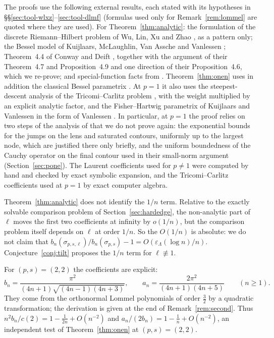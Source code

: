 The proofs use the following external results, each stated with its hypotheses in
\S\S\ref{sec:tool-wlxz}--\ref{sec:tool-dlmf} (formulas used only for Remark~\ref{rem:lommel} are quoted where they are
used). For Theorem~\ref{thm:analytic}: the formulation of the discrete Riemann--Hilbert problem of Wu, Lin, Xu and Zhao
\cite{WLXZ}, as a pattern only; the Bessel model of Kuijlaars, McLaughlin, Van Assche and Vanlessen \cite[\S6]{KMVV};
Theorem~4.4 of Conway and Deift \cite{CD}, together with the argument of their Theorem~4.7 and Proposition~4.9 and one
direction of their Proposition~4.6, which we re-prove; and special-function facts from \cite{DLMF}.
Theorem~\ref{thm:onen} uses in addition the classical Bessel parametrix \cite[(6.42)--(6.53)]{KMVV}. At $p=1$ it also
uses the steepest-descent analysis of the Tricomi--Carlitz problem \cite[\S\S3--6]{WLXZ}, with the weight multiplied by
an explicit analytic factor, and the Fisher--Hartwig parametrix of Kuijlaars and Vanlessen \cite[\S5]{KV} in the form
of Vanlessen \cite[\S4]{Van}. In particular, at $p=1$ the proof relies on two steps of the analysis of \cite{WLXZ}
that we do not prove again: the exponential bounds for the jumps on the lens and saturated contours, uniformly up to the largest node,
which are justified there only briefly, and the uniform boundedness of the Cauchy operator on the final contour used in
their small-norm argument (Section~\ref{sec:pone}). The Laurent coefficients used for $p\ne1$ were computed by hand and checked by
exact symbolic expansion, and the Tricomi--Carlitz coefficients used at $p=1$ by exact computer algebra.

\begin{remark}\label{rem:scope}
Theorem~\ref{thm:analytic} does not identify the $1/n$ term. Relative to the exactly solvable comparison problem of
Section~\ref{sec:hardedge}, the non-analytic part of $\ell$ moves the first two coefficients at infinity by $o(1/n)$,
but the comparison problem itself depends on $\ell$ at order $1/n$. So the $O(1/n)$ is absolute: we do not claim that
$b_n(\sigma_{p,s,\ell})/b_n(\sigma_{p,s})-1=O(\varepsilon_\Lambda(\log n)/n)$. Conjecture~\ref{conj:tilt} proposes the
$1/n$ term for $\ell\not\equiv1$.
\end{remark}

\begin{remark}[The case $(p,s)=(2,2)$]\label{rem:lommel}
For $(p,s)=(2,2)$ the coefficients are explicit:
\[
  b_n=\frac{\pi^2}{(4n+1)\sqrt{(4n-1)(4n+3)}},\qquad a_n=\frac{2\pi^2}{(4n+1)(4n+5)}\qquad(n\ge1).
\]
They come from the orthonormal Lommel polynomials of order $\frac32$ \cite[\S3]{VA} by a quadratic transformation; the
derivation is given at the end of Remark~\ref{rem:second}. Thus $n^2b_n/c(2)=1-\frac1{2n}+O(n^{-2})$ and
$a_n/(2b_n)=1-\frac1n+O(n^{-2})$, an independent test of Theorem~\ref{thm:onen} at $(p,s)=(2,2)$.
\end{remark}

